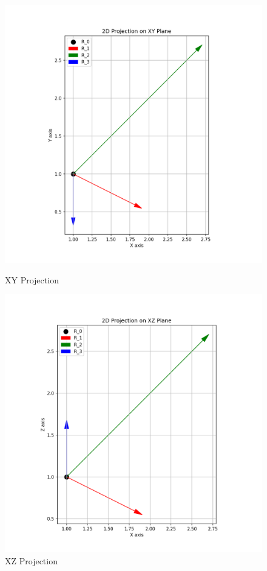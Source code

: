 \begin{figure}[H]
    \centering
    \begin{minipage}{0.48\textwidth}
        \centering
        \includegraphics[width=\textwidth]{figures/custom1_xy.png}
        \caption*{XY Projection}
    \end{minipage}\hfill
    \begin{minipage}{0.48\textwidth}
        \centering
        \includegraphics[width=\textwidth]{figures/custom1_xz.png}
        \caption*{XZ Projection}
    \end{minipage}
    

\end{figure}
